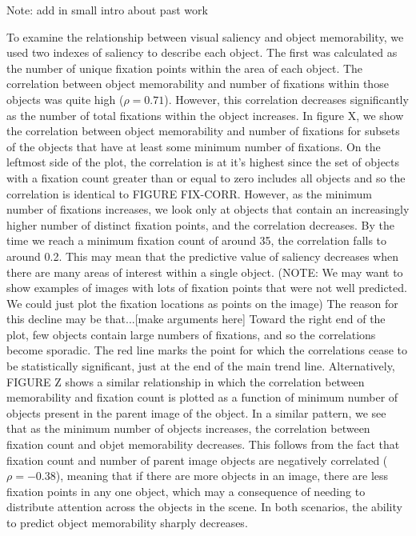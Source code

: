 Note: add in small intro about past work

To examine the relationship between visual saliency and object memorability, we used two indexes of saliency to describe each object. The first was calculated as the number of unique fixation points within the area of each object. The correlation between object memorability and number of fixations within those objects was quite high ($\rho = 0.71$). However, this correlation decreases significantly as the number of total fixations within the object increases. In figure X, we show the correlation between object memorability and number of fixations for subsets of the objects that have at least some minimum number of fixations. On the leftmost side of the plot, the correlation is at it's highest since the set of objects with a fixation count greater than or equal to zero includes all objects and so the correlation is identical to FIGURE FIX-CORR. However, as the minimum number of fixations increases, we look only at objects that contain an increasingly higher number of distinct fixation points, and the correlation decreases. By the time we reach a minimum fixation count of around 35, the correlation falls to around 0.2. This may mean that the predictive value of saliency decreases when there are many areas of interest within a single object. (NOTE: We may want to show examples of images with lots of fixation points that were not well predicted. We could just plot the fixation locations as points on the image) The reason for this decline may be that...[make arguments here] Toward the right end of the plot, few objects contain large numbers of fixations, and so the correlations become sporadic. The red line marks the point for which the correlations cease to be statistically significant, just at the end of the main trend line. Alternatively, FIGURE Z shows a similar relationship in which the correlation between memorability and fixation count is plotted as a function of minimum number of objects present in the parent image of the object. In a similar pattern, we see that as the minimum number of objects increases, the correlation between fixation count and objet memorability decreases. This follows from the fact that fixation count and number of parent image objects are negatively correlated ($\rho = -0.38$), meaning that if there are more objects in an image, there are less fixation points in any one object, which may a consequence of needing to distribute attention across the objects in the scene. In both scenarios, the ability to predict object memorability sharply decreases.

